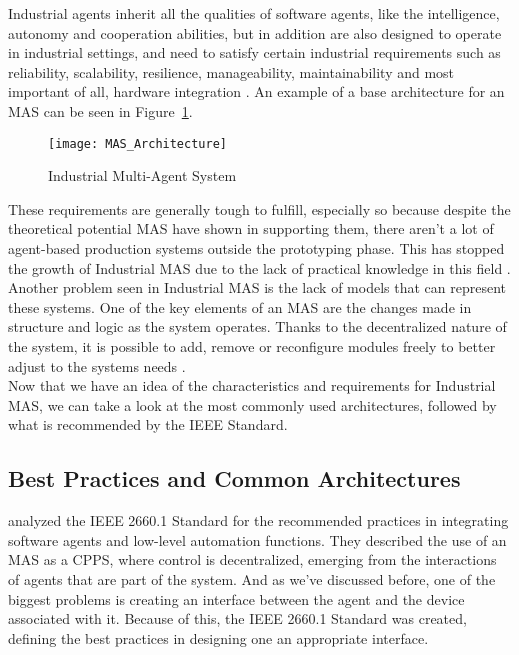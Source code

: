 Industrial agents inherit all the qualities of software agents, like the intelligence, autonomy and cooperation abilities, but in addition are also designed to operate in industrial settings, and need to satisfy certain industrial requirements such as reliability, scalability, resilience, manageability, maintainability and most important of all, hardware integration \cite{Leitao2021}. An example of a base architecture for an MAS can be seen in Figure~\ref{fig:MAS_Architecture}. \\

\begin{figure}[hbt!]
	\centering
	\texttt{[image: MAS\_Architecture]}
	\caption{Industrial Multi-Agent System}
	\label{fig:MAS_Architecture}
\end{figure}

These requirements are generally tough to fulfill, especially so because despite the theoretical potential MAS have shown in supporting them, there aren't a lot of agent-based production systems outside the prototyping phase. This has stopped the growth of Industrial MAS due to the lack of practical knowledge in this field \cite{Karnouskos2019}. Another problem seen in Industrial MAS is the lack of models that can represent these systems. One of the key elements of an MAS are the changes made in structure and logic as the system operates. Thanks to the decentralized nature of the system, it is possible to add, remove or reconfigure modules freely to better adjust to the systems needs \cite{Karnouskos2019}.\\

Now that we have an idea of the characteristics and requirements for Industrial MAS, we can take a look at the most commonly used architectures, followed by what is recommended by the IEEE Standard.

\subsection{Best Practices and Common Architectures}
\label{subsec:best_practices_and_common_architectures}

\citeauthor{Leitao2021} \cite{Leitao2021} analyzed the IEEE 2660.1 Standard for the recommended practices in integrating software agents and low-level automation functions. They described the use of an MAS as a CPPS, where control is decentralized, emerging from the interactions of agents that are part of the system. And as we've discussed before, one of the biggest problems is creating an interface between the agent and the device associated with it. Because of this, the IEEE 2660.1 Standard was created, defining the best practices in designing one an appropriate interface.\\

